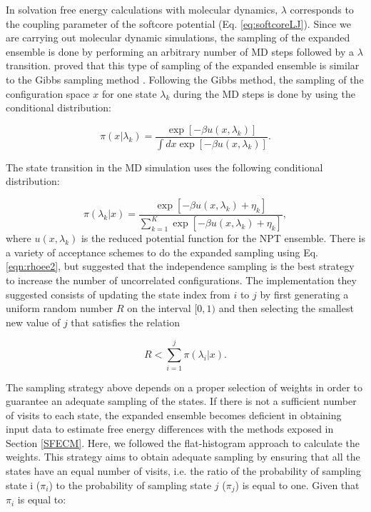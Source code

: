 In solvation free energy calculations with molecular dynamics, $\lambda$ corresponds to the coupling parameter of the softcore potential (Eq. \ref{eq:softcoreLJ}). Since we are carrying out molecular dynamic simulations, the sampling of the expanded ensemble is done by performing an arbitrary number of MD  steps followed by a $\lambda$ transition.  proved that this type of sampling of the expanded ensemble is similar to the Gibbs sampling method \cite{geman1984,liu2002}. Following the Gibbs method, the sampling of the configuration space $x$ for one state $\lambda_{k}$ during the MD steps is done by using the conditional distribution:

\begin{equation}
\pi(x|\lambda_{k}) = \dfrac{\exp[-\beta u(x,\lambda_{k})]}{\int dx \exp [- \beta u(x,\lambda_{k})]}.
\label{eqn:rhoee1}
\end{equation} 

The state transition in the MD simulation uses the following conditional distribution:

\begin{equation}
\pi(\lambda_{k}|x) = \dfrac{\exp[-\beta u(x,\lambda_{k}) + \eta_{k}]}{ \sum_{k=1}^{K} \exp [- \beta u(x,\lambda_{k})+ \eta_{k}]},
\label{eqn:rhoee2}
\end{equation} 
where $u(x,\lambda_{k})$ is the reduced potential function for the NPT ensemble. There is a variety of acceptance schemes to do the expanded sampling using Eq. \eqref{eqn:rhoee2}, but  suggested that the independence sampling \cite{liu2002} is the best strategy to increase the number of uncorrelated configurations. The implementation they suggested consists of updating the state index from $i$ to $j$ by first generating a uniform random number $R$ on the interval $[0,1)$ and then selecting the smallest new value of $j$ that satisfies  the relation

\begin{equation}
R < \sum_{i=1}^{j} \pi(\lambda_{i}|x) .
\label{eqn:relee2}
\end{equation} 

The sampling strategy above depends on a proper selection of weights in order to guarantee an adequate sampling of the states. If there is not a sufficient number of visits to each state, the expanded ensemble becomes deficient in obtaining input data to estimate free energy differences with the methods exposed in Section \ref{SFECM}. Here, we followed the flat-histogram approach \cite{bernd1992,bernd1993,dayal2004} to calculate the weights. This strategy aims to obtain adequate sampling by ensuring that all the states have an equal number of visits, i.e. the ratio of the probability of sampling state i ($\pi_{i}$) to the probability of sampling state $j$ ($\pi_{j}$) is equal to one. Given that $\pi_{i}$ is equal to:

